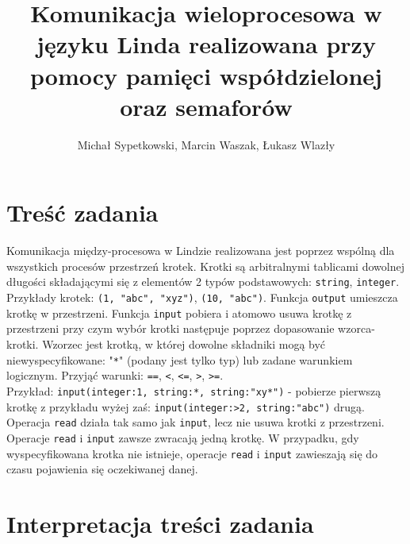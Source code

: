 \documentclass[a4paper]{article}
\title{Komunikacja wieloprocesowa w języku Linda realizowana przy pomocy pamięci współdzielonej oraz semaforów}
\author{Michał Sypetkowski, Marcin Waszak, Łukasz Wlazły}
\date{}
\begin{document}
	\maketitle
	\newpage

	\section{Treść zadania}
	Komunikacja między-procesowa w Lindzie realizowana jest poprzez wspólną dla wszystkich procesów przestrzeń krotek.
    Krotki są arbitralnymi tablicami dowolnej długości składającymi się z elementów 2 typów podstawowych: \texttt{string}, \texttt{integer}.
    Przykłady krotek: \texttt{(1, "abc", "xyz")}, \texttt{(10, "abc")}.
    Funkcja \texttt{output} umieszcza krotkę w przestrzeni.
    Funkcja \texttt{input} pobiera i atomowo usuwa krotkę z przestrzeni przy czym wybór krotki następuje poprzez dopasowanie wzorca-krotki.
    Wzorzec jest krotką, w której dowolne składniki mogą być niewyspecyfikowane: "\texttt{*}" (podany jest tylko typ) lub zadane warunkiem logicznym. Przyjąć warunki: \texttt{==}, \texttt{<}, \texttt{<=}, \texttt{>}, \texttt{>=}. \\
    Przykład: \texttt{input(integer:1, string:*, string:"xy*")} - pobierze pierwszą krotkę z przykładu wyżej zaś: \texttt{input(integer:>2, string:"abc")} drugą.
    Operacja \texttt{read} działa tak samo jak \texttt{input}, lecz nie usuwa krotki z przestrzeni. Operacje \texttt{read} i \texttt{input} zawsze zwracają jedną krotkę.
    W przypadku, gdy wyspecyfikowana krotka nie istnieje, operacje \texttt{read} i \texttt{input} zawieszają się do czasu pojawienia się oczekiwanej danej.

	\section{Interpretacja treści zadania}
\end{document}
